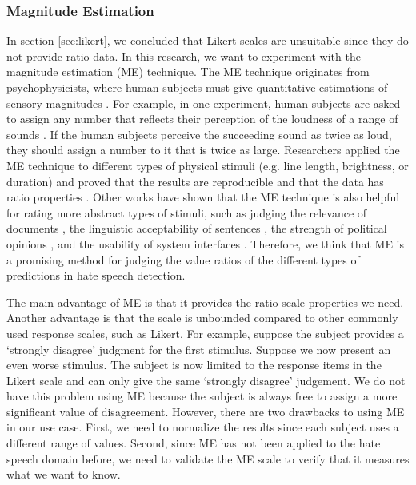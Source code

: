 \subsubsection{Magnitude Estimation}
\label{sec:me}
In section \ref{sec:likert}, we concluded that Likert scales are unsuitable since they do not provide ratio data.
%
In this research, we want to experiment with the magnitude estimation (ME) technique.
%
The ME technique originates from psychophysicists, where human subjects must give quantitative estimations of sensory magnitudes \citep{stevens1956direct}.
%
For example, in one experiment, human subjects are asked to assign any number that reflects their perception of the loudness of a range of sounds \citep{stevens1956direct}.
%
If the human subjects perceive the succeeding sound as twice as loud, they should assign a number to it that is twice as large.
%
Researchers applied the ME technique to different types of physical stimuli (e.g. line length, brightness, or duration) and proved that the results are reproducible and that the data has ratio properties \citep{moskowitz1977magnitude}.
%
Other works have shown that the ME technique is also helpful for rating more abstract types of stimuli, such as judging the relevance of documents \citep{maddalena2017crowdsourcing, roitero2018fine}, the linguistic acceptability of sentences \citep{bard1996magnitude}, the strength of political opinions \citep{lodge1979comparisons, lodge1976calibration}, and the usability of system interfaces \citep{mcgee2004master}.
%
Therefore, we think that ME is a promising method for judging the value ratios of the different types of predictions in hate speech detection.
%

%
The main advantage of ME is that it provides the ratio scale properties we need.
%
Another advantage is that the scale is unbounded compared to other commonly used response scales, such as Likert.
%
For example, suppose the subject provides a `strongly disagree' judgment for the first stimulus.
%
Suppose we now present an even worse stimulus.
%
The subject is now limited to the response items in the Likert scale and can only give the same `strongly disagree' judgement.
%
We do not have this problem using ME because the subject is always free to assign a more significant value of disagreement.
%
However, there are two drawbacks to using ME in our use case.
%
First, we need to normalize the results since each subject uses a different range of values.
%
Second, since ME has not been applied to the hate speech domain before, we need to validate the ME scale to verify that it measures what we want to know.
%

